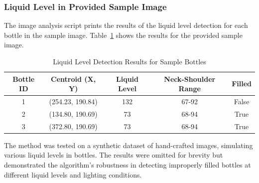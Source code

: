 \documentclass[a4paper,12pt]{article}
\begin{document}
\subsubsection{Liquid Level in Provided Sample Image}

The image analysis script prints the results of the liquid level detection for each bottle in the sample image. Table~\ref{tab:bottle_results} shows the results for the provided sample image.

\begin{table}[!htbp]
    \centering
    \caption{Liquid Level Detection Results for Sample Bottles}
    \label{tab:bottle_results}
    \begin{tabular}{|c|c|c|c|c|}
        \hline
        \textbf{Bottle ID} & \textbf{Centroid (X, Y)} & \textbf{Liquid Level} & \textbf{Neck-Shoulder Range} & \textbf{Filled} \\
        \hline
        1 & (254.23, 190.84) & 132 & 67-92 & False \\
        2 & (134.80, 190.69) & 73 & 68-94 & True \\
        3 & (372.80, 190.69) & 73 & 68-94 & True \\
        \hline
    \end{tabular}
\end{table}

The method was tested on a synthetic dataset of hand-crafted images, simulating various liquid levels in bottles. The results were omitted for brevity but demonstrated the algorithm's robustness in detecting improperly filled bottles at different liquid levels and lighting conditions.
\end{document}
